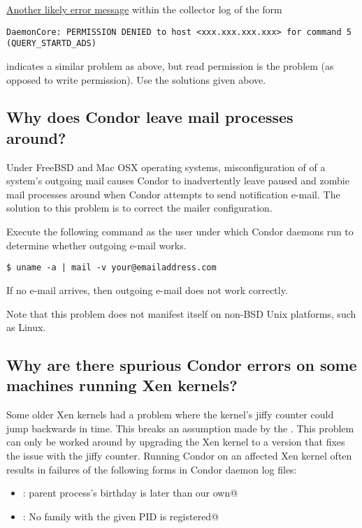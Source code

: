 \underline{Another likely error message} within the collector log of the form
\footnotesize
\begin{verbatim}
DaemonCore: PERMISSION DENIED to host <xxx.xxx.xxx.xxx> for command 5 (QUERY_STARTD_ADS)
\end{verbatim}
\normalsize
indicates a similar problem as above, but read permission
is the problem (as opposed to write permission).
Use the solutions given above.

\subsection*{Why does Condor leave mail processes around?}

Under FreeBSD and Mac OSX operating systems,
misconfiguration of of a system's outgoing mail causes
Condor to inadvertently leave paused and zombie mail
processes around when Condor attempts to send notification e-mail.
The solution to this problem is
to correct the mailer configuration.

Execute the following command as the user under which Condor
daemons run to determine whether outgoing e-mail works.

\begin{verbatim}
$ uname -a | mail -v your@emailaddress.com
\end{verbatim}

If no e-mail arrives, then outgoing e-mail does not work
correctly.

Note that this problem does not manifest itself
on non-BSD Unix platforms, such as Linux.

\subsection*{\label{sec:xen-jiffies-bug}Why are there spurious Condor errors on some machines running Xen kernels?}

Some older Xen kernels had a problem where the kernel's jiffy counter
could jump backwards in time. This breaks an assumption made by the
. This problem can only be worked around by upgrading
the Xen kernel to a version that fixes the issue with the jiffy counter.
Running Condor on an affected Xen kernel often results in failures
of the following forms in Condor daemon log files:
\begin{itemize}
\item \verb@error: parent process's birthday is later than our own@
\item \verb@ERROR: No family with the given PID is registered@
\end{itemize}

